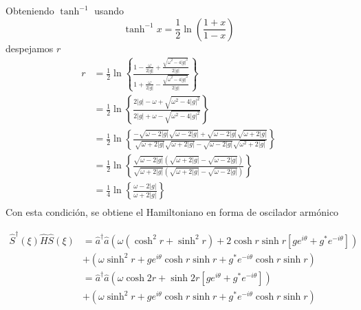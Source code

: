Obteniendo $\tanh^{-1}$ usando
\begin{equation*}
	\tanh^{-1}{x} = \frac{1}{2}\ln{\left( \frac{1+x}{1-x} \right)}
\end{equation*}
despejamos $r$
\begin{align*}
	r & =\frac{1}{2} \ln \left\{ \frac{\displaystyle{1 - \frac{\omega}{2\vert g\vert} + \frac{\sqrt{\omega^{2}-4\vert g\vert^{2}}}{2\vert g\vert}}}{\displaystyle{1+ \frac{\omega}{2\vert g\vert} - \frac{\sqrt{\omega^{2}-4\vert g\vert^{2}}}{2\vert g\vert}}} \right\}                         \\
	  & =  \frac{1}{2} \ln \left\{ \frac{2\vert g \vert -\omega + \sqrt{\omega^{2}-4\vert g\vert^{2}}}{2\vert g \vert + \omega - \sqrt{\omega^{2}-4\vert g\vert^{2}}} \right\}                                                                                                                   \\
	  & =  \frac{1}{2} \ln \left\{ \frac{-\sqrt{\omega - 2\vert g\vert}\sqrt{\omega - 2\vert g\vert} + \sqrt{\omega-2\vert g\vert}\sqrt{\omega+2\vert g\vert}}{\sqrt{\omega + 2\vert g\vert}\sqrt{\omega + 2\vert g\vert} - \sqrt{\omega-2\vert g\vert}\sqrt{\omega^{2}+2\vert g\vert}} \right\} \\
	  & =  \frac{1}{2} \ln \left\{ \frac{\sqrt{\omega - 2\vert g\vert}\left(\sqrt{\omega + 2\vert g\vert} - \sqrt{\omega-2\vert g\vert}\right)}{\sqrt{\omega + 2\vert g\vert}\left(\sqrt{\omega + 2\vert g\vert} - \sqrt{\omega-2\vert g\vert}\right)} \right\}                                  \\
	  & =  \frac{1}{4} \ln \left\{ \frac{\omega - 2\vert g\vert}{\omega + 2\vert g\vert} \right\}                                                                                                                                                                                                \\
\end{align*}
Con esta condición, se obtiene el Hamiltoniano en forma de oscilador armónico

\begin{align*}
	\hat{S}^{\dagger}(\xi) \hat{H} \hat{S}(\xi) & = \hat{a}^{\dagger}\hat{a} \left( \omega (\cosh^2 {r} + \sinh^2 {r}) + 2\cosh{r}\sinh{r} \left[ g e^{i\theta} + g^{*} e^{-i\theta} \right] \right) \\
	                                            & + \left( \omega \sinh^2 {r} + g e^{i\theta}\cosh{r}\sinh{r} + g^{*}e^{-i\theta}\cosh{r}\sinh{r} \right)                                            \\
	                                            & = \hat{a}^{\dagger}\hat{a} \left( \omega \cosh{2r} + \sinh{2r} \left[ g e^{i\theta} + g^{*} e^{-i\theta} \right] \right)                           \\
	                                            & + \left( \omega \sinh^2 {r} + g e^{i\theta}\cosh{r}\sinh{r} + g^{*}e^{-i\theta}\cosh{r}\sinh{r} \right)                                            \\
\end{align*}


